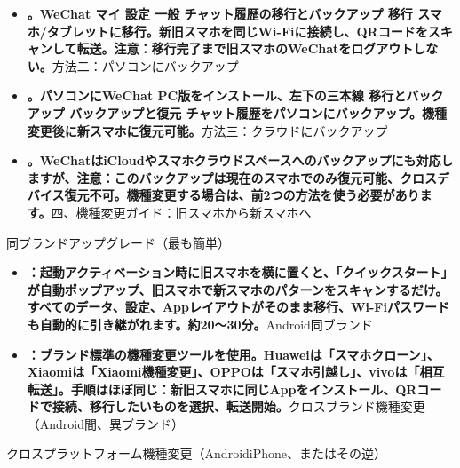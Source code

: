 \begin{itemize}
  \item \textbf{。WeChat マイ 設定 一般 チャット履歴の移行とバックアップ 移行 スマホ/タブレットに移行。新旧スマホを同じWi-Fiに接続し、QRコードをスキャンして転送。注意：移行完了まで旧スマホのWeChatをログアウトしない。}方法二：パソコンにバックアップ
  \item \textbf{。パソコンにWeChat PC版をインストール、左下の三本線 移行とバックアップ バックアップと復元 チャット履歴をパソコンにバックアップ。機種変更後に新スマホに復元可能。}方法三：クラウドにバックアップ
  \item \textbf{。WeChatはiCloudやスマホクラウドスペースへのバックアップにも対応しますが、注意：このバックアップは現在のスマホでのみ復元可能、クロスデバイス復元不可。機種変更する場合は、前2つの方法を使う必要があります。}四、機種変更ガイド：旧スマホから新スマホへ
\end{itemize}


同ブランドアップグレード（最も簡単）


\begin{itemize}
  \item \textbf{：起動アクティベーション時に旧スマホを横に置くと、「クイックスタート」が自動ポップアップ、旧スマホで新スマホのパターンをスキャンするだけ。すべてのデータ、設定、Appレイアウトがそのまま移行、Wi-Fiパスワードも自動的に引き継がれます。約20〜30分。}Android同ブランド
  \item \textbf{：ブランド標準の機種変更ツールを使用。Huaweiは「スマホクローン」、Xiaomiは「Xiaomi機種変更」、OPPOは「スマホ引越し」、vivoは「相互転送」。手順はほぼ同じ：新旧スマホに同じAppをインストール、QRコードで接続、移行したいものを選択、転送開始。}クロスブランド機種変更（Android間、異ブランド）
\end{itemize}


クロスプラットフォーム機種変更（AndroidiPhone、またはその逆）


